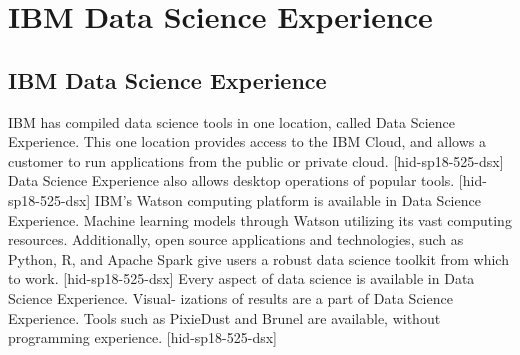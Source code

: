 \section{IBM Data Science Experience}


\subsection{IBM Data Science Experience}
IBM has compiled data science tools in one location, 
called Data Science Experience. This one location provides
access to the IBM Cloud, and allows a customer to run 
applications from the public or private cloud. 
[hid-sp18-525-dsx]
Data Science Experience also allows desktop operations 
of popular tools. [hid-sp18-525-dsx]
IBM’s Watson computing platform is available in Data Science
Experience. Machine learning models through Watson utilizing
its vast computing resources. Additionally, open source 
applications and technologies, such as Python, R, and Apache 
Spark give users a robust data science toolkit from which to
work. [hid-sp18-525-dsx]
Every aspect of data science is available in Data Science 
Experience. Visual- izations of results are a part of Data 
Science Experience. Tools such as PixieDust and Brunel are 
available, without programming experience. [hid-sp18-525-dsx]
